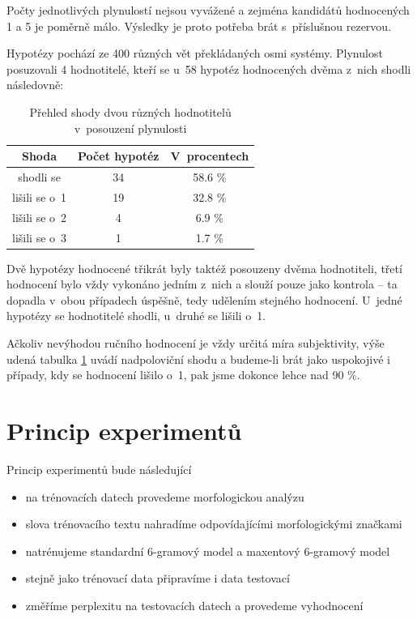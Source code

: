 \documentclass[12pt,a4paper]{report}
\begin{document}

Počty jednotlivých plynulostí nejsou vyvážené a zejména kandidátů hodnocených 1 a 5 je poměrně málo. Výsledky je proto potřeba brát s~příslušnou rezervou.

\pagebreak

Hypotézy pochází ze 400 různých vět překládaných osmi systémy. Plynulost posuzovali 4 hodnotitelé, kteří se u~58 hypotéz hodnocených dvěma z~nich shodli následovně:

\begin{table}[!htbp]
\begin{center}\begin{tabular}{|c|c|c|}
	\hline
	\textbf{Shoda} & \textbf{Počet hypotéz} & \textbf{V~procentech}\\
	\hline
	shodli se & 34 & 58.6 \%\\
	\hline
	lišili se o~1 & 19 & 32.8 \%\\
	\hline
	lišili se o~2 & 4 & 6.9 \%\\
	\hline
	lišili se o~3 & 1 & 1.7 \%\\
	\hline
\end{tabular}
\caption{Přehled shody dvou různých hodnotitelů v~posouzení plynulosti}\label{tb:shoda}
\end{center}\end{table}

Dvě hypotézy hodnocené třikrát byly taktéž posouzeny dvěma hodnotiteli, třetí hodnocení bylo vždy vykonáno jedním z~nich a slouží pouze jako kontrola -- ta dopadla v~obou případech úspěšně, tedy udělením stejného hodnocení. U~jedné hypotézy se hodnotitelé shodli, u~druhé se lišili o~1.

Ačkoliv nevýhodou ručního hodnocení je vždy určitá míra subjektivity, výše udená tabulka \ref{tb:shoda} uvádí nadpoloviční shodu a budeme-li brát jako uspokojivé i případy, kdy se hodnocení lišilo o~1, pak jsme dokonce lehce nad 90 \%.

\section{Princip experimentů}

Princip experimentů bude následující
\begin{itemize}
\item{na trénovacích datech provedeme morfologickou analýzu}
\item{slova trénovacího textu nahradíme odpovídajícími morfologickými značkami}
\item{natrénujeme standardní 6-gramový model a maxentový 6-gramový model}
\item{stejně jako trénovací data připravíme i data testovací}
\item{změříme perplexitu na testovacích datech a provedeme vyhodnocení}
\end{itemize}
\end{document}
